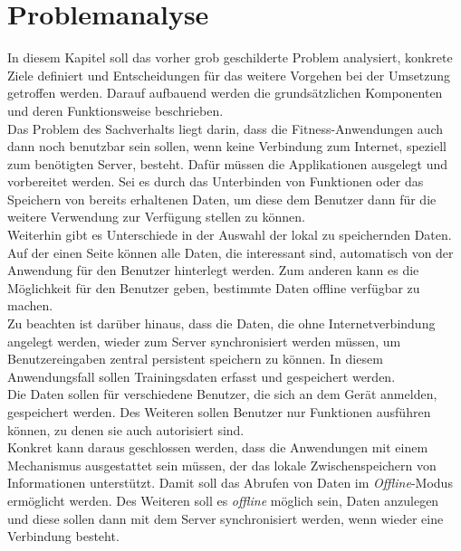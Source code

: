 \chapter{Problemanalyse}
\label{cha:problemanalyse}
In diesem Kapitel soll das vorher grob geschilderte Problem analysiert, konkrete Ziele definiert und Entscheidungen für das weitere Vorgehen bei der Umsetzung getroffen werden. Darauf aufbauend werden die grundsätzlichen Komponenten und deren Funktionsweise beschrieben.\\

Das Problem des Sachverhalts liegt darin, dass die Fitness-Anwendungen auch dann noch benutzbar sein sollen, wenn keine Verbindung zum Internet, speziell zum benötigten Server, besteht. Dafür müssen die Applikationen ausgelegt und vorbereitet werden. Sei es durch das Unterbinden von Funktionen oder das Speichern von bereits erhaltenen Daten, um diese dem Benutzer dann für die weitere Verwendung zur Verfügung stellen zu können. \\
Weiterhin gibt es Unterschiede in der Auswahl der lokal zu speichernden Daten. Auf der einen Seite können alle Daten, die interessant sind, automatisch von der Anwendung für den Benutzer hinterlegt werden. Zum anderen kann es die Möglichkeit für den Benutzer geben, bestimmte Daten offline verfügbar zu machen.\\
Zu beachten ist darüber hinaus, dass die Daten, die ohne Internetverbindung angelegt werden, wieder zum Server synchronisiert werden müssen, um Benutzereingaben zentral persistent speichern zu können. In diesem Anwendungsfall sollen Trainingsdaten erfasst und gespeichert werden.\\
Die Daten sollen für verschiedene Benutzer, die sich an dem Gerät anmelden, gespeichert werden. Des Weiteren sollen Benutzer nur Funktionen ausführen können, zu denen sie auch autorisiert sind.\\

Konkret kann daraus geschlossen werden, dass die Anwendungen mit einem Mechanismus ausgestattet sein müssen, der das lokale Zwischenspeichern von Informationen unterstützt. Damit soll das Abrufen von Daten im \textit{Offline}-Modus ermöglicht werden. Des Weiteren soll es \textit{offline} möglich sein, Daten anzulegen und diese sollen dann mit dem Server synchronisiert werden, wenn wieder eine Verbindung besteht.\\


